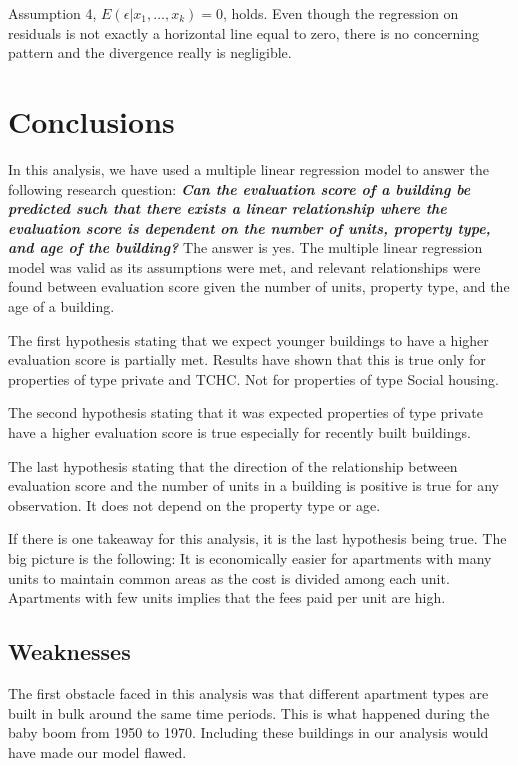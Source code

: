 \documentclass[
]{article}
\begin{document}
Assumption 4, \emph{\(E(\epsilon| x_1,…, x_k) = 0\)}, holds. Even though
the regression on residuals is not exactly a horizontal line equal to
zero, there is no concerning pattern and the divergence really is
negligible.

\hypertarget{conclusions}{%
\section{Conclusions}\label{conclusions}}

In this analysis, we have used a multiple linear regression model to
answer the following research question: \textbf{\emph{Can the evaluation
score of a building be predicted such that there exists a linear
relationship where the evaluation score is dependent on the number of
units, property type, and age of the building?}} The answer is yes. The
multiple linear regression model was valid as its assumptions were met,
and relevant relationships were found between evaluation score given the
number of units, property type, and the age of a building.

The first hypothesis stating that we expect younger buildings to have a
higher evaluation score is partially met. Results have shown that this
is true only for properties of type private and TCHC. Not for properties
of type Social housing.

The second hypothesis stating that it was expected properties of type
private have a higher evaluation score is true especially for recently
built buildings.

The last hypothesis stating that the direction of the relationship
between evaluation score and the number of units in a building is
positive is true for any observation. It does not depend on the property
type or age.

If there is one takeaway for this analysis, it is the last hypothesis
being true. The big picture is the following: It is economically easier
for apartments with many units to maintain common areas as the cost is
divided among each unit. Apartments with few units implies that the fees
paid per unit are high.

\hypertarget{weaknesses}{%
\subsection{Weaknesses}\label{weaknesses}}

The first obstacle faced in this analysis was that different apartment
types are built in bulk around the same time periods. This is what
happened during the baby boom from 1950 to 1970. Including these
buildings in our analysis would have made our model flawed.
\end{document}

